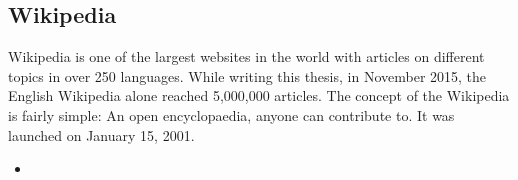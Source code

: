 \documentclass[11pt]{article}
\begin{document}
\subsection{Wikipedia}
Wikipedia is one of the largest websites in the world with articles on different topics in over 250 languages. While writing this thesis, in November 2015, the English Wikipedia alone reached 5,000,000 articles. 
The concept of the Wikipedia is fairly simple: An open encyclopaedia, anyone can contribute to. It was launched on January 15, 2001. 

\begin{itemize}
\item
\end{itemize}
\end{document}
